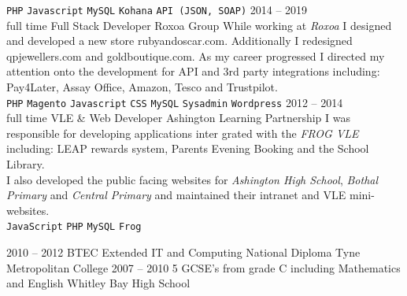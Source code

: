 \documentclass[9pt]{cv}
\begin{document}
\begin{entrylist}
{		\texttt{PHP}\slashsep
		\texttt{Javascript}\slashsep
		\texttt{MySQL}\slashsep
		\texttt{Kohana}\slashsep
		\texttt{API (JSON, SOAP)}}
	\entry
		{2014 -- 2019\\\footnotesize{full time}}
		{Full Stack Developer}
		{Roxoa Group}
		{While working at \textit{Roxoa} I designed and developed a new store rubyandoscar.com. Additionally I redesigned qpjewellers.com and goldboutique.com. As my career progressed I directed my attention onto the development for API and 3rd party integrations including: Pay4Later, Assay Office, Amazon, Tesco and Trustpilot.\\
		\texttt{PHP}\slashsep
		\texttt{Magento}\slashsep
		\texttt{Javascript}\slashsep
		\texttt{CSS}\slashsep
		\texttt{MySQL}\slashsep
		\texttt{Sysadmin}\slashsep
		\texttt{Wordpress}}
	\entry
		{2012 -- 2014\\\footnotesize{full time}}
		{VLE \& Web Developer}
		{Ashington Learning Partnership}
		{I was responsible for developing applications inter grated with the \textit{FROG VLE} including: LEAP rewards system, Parents Evening Booking and the School Library.\\
		I also developed the public facing websites for \textit{Ashington High School}, \textit{Bothal Primary} and \textit{Central Primary} and maintained their intranet and VLE mini-websites.\\
		\texttt{JavaScript}\slashsep
		\texttt{PHP}\slashsep
		\texttt{MySQL}\slashsep
		\texttt{Frog}}
\end{entrylist}



\begin{entrylist}
	\entry
		{2010 -- 2012}
		{BTEC Extended IT and Computing National Diploma}
		{Tyne Metropolitan College}
		{}
	\entry
		{2007 -- 2010}
		{5 GCSE's from grade C including Mathematics and English}
		{Whitley Bay High School}
		{}
\end{entrylist}


	

	
\end{document}
